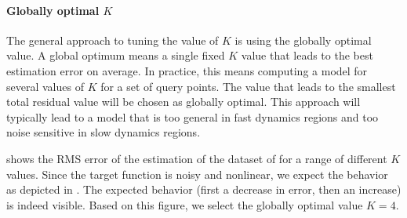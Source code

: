 \paragraph{Globally optimal $K$}
The general approach to tuning the value of $K$ is using the globally optimal value. A global optimum means a single fixed $K$ value that leads to the best estimation error on average. In practice, this means computing a model for several values of $K$ for a set of query points. The value that leads to the smallest total residual value will be chosen as globally optimal. This approach will typically lead to a model that is too general in fast dynamics regions and too noise sensitive in slow dynamics regions.

 shows the RMS error of the estimation of the dataset of  for a range of different $K$ values. Since the target function is noisy and nonlinear, we expect the behavior as depicted in . The expected behavior (first a decrease in error, then an increase) is indeed visible. Based on this figure, we select the globally optimal value $K=4$. 

